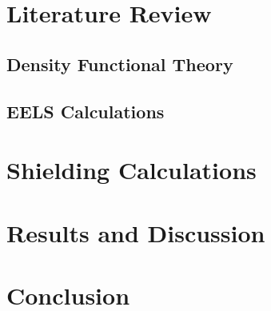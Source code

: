 \documentclass[12pt]{report}
\begin{document}



\chapter{Literature Review}\label{literature_review}

\section{Density Functional Theory}\label{dft_section}

\section{EELS Calculations}\label{ELNES_section}

\chapter{Shielding Calculations}\label{methods}

\chapter{Results and Discussion}\label{results}

\chapter{Conclusion}\label{conclusion}






\newpage




\end{document}
